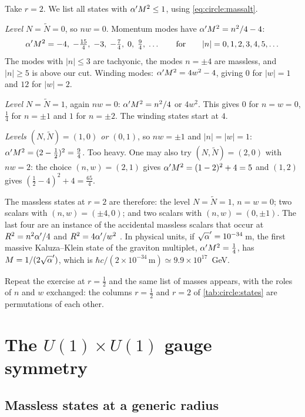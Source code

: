 \begin{example}[Worked example: the spectrum at $R=2\sqrt\ap$]\label{ex:circle:numbers}
Take $r=2$. We list all states with $\alpha' M^2\le1$, using \eqref{eq:circle:massalt}.

\emph{Level $N=\tilde N=0$}, so $nw=0$. Momentum modes have
$\alpha' M^2=n^2/4-4$:
\[
 \alpha' M^2=-4,\;-\tfrac{15}{4},\;-3,\;-\tfrac74,\;0,\;\tfrac94,\;\dots
 \qquad\text{for}\qquad |n|=0,1,2,3,4,5,\dots
\]
The modes with $|n|\le3$ are tachyonic, the modes $n=\pm4$ are massless, and $|n|\ge5$ is above our cut.
Winding modes: $\alpha' M^2=4w^2-4$, giving $0$ for $|w|=1$ and $12$ for $|w|=2$.

\emph{Level $N=\tilde N=1$}, again $nw=0$: $\alpha' M^2=n^2/4$ or $4w^2$. This gives $0$ for
$n=w=0$, $\frac14$ for $n=\pm1$ and $1$ for $n=\pm2$. The winding states start at $4$.

\emph{Levels $(N,\tilde N)=(1,0)$ or $(0,1)$}, so $nw=\pm1$ and $|n|=|w|=1$:
$\alpha' M^2=(2-\frac12)^2=\frac94$. Too heavy. One may also try $(N,\tilde N)=(2,0)$ with
$nw=2$: the choice $(n,w)=(2,1)$ gives $\alpha' M^2=(1-2)^2+4=5$ and $(1,2)$ gives
$(\frac12-4)^2+4=\frac{65}{4}$.

The massless states at $r=2$ are therefore: the level $N=\tilde N=1$, $n=w=0$; two scalars
with $(n,w)=(\pm4,0)$; and two scalars with $(n,w)=(0,\pm1)$. The last four are an instance of
the accidental massless scalars that occur at $R^2=n^2\alpha'/4$ and $R^2=4\alpha'/w^2$
. In physical units, if $\sqrt\ap=10^{-34}\,$m, the
first massive Kaluza--Klein state of the graviton multiplet, $\alpha' M^2=\frac14$, has
$M=1/(2\sqrt\ap)$, which is $\hbar c/(2\times10^{-34}\,\mathrm m)\simeq9.9\times10^{17}$~GeV.

Repeat the exercise at $r=\frac12$ and the same list of masses appears, with the roles of $n$
and $w$ exchanged: the columns $r=\frac12$ and $r=2$ of \cref{tab:circle:states} are
permutations of each other.
\end{example}

\section{The \texorpdfstring{$U(1)\times U(1)$}{U(1) x U(1)} gauge symmetry}
\label{sec:circle:gauge}

\subsection{Massless states at a generic radius}

